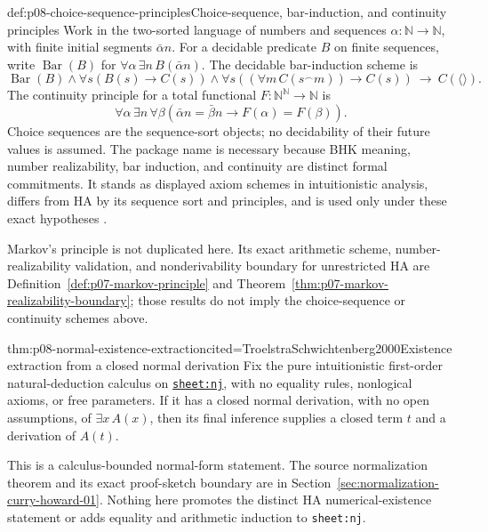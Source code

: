 \begin{hbdefinition}{def:p08-choice-sequence-principles}{Choice-sequence, bar-induction, and continuity principles}
Work in the two-sorted language of numbers and sequences
\(\alpha:\mathbb N\to\mathbb N\), with finite initial segments
\(\bar\alpha n\). For a decidable predicate \(B\) on finite sequences, write
\(\operatorname{Bar}(B)\) for
\(\forall\alpha\,\exists n\,B(\bar\alpha n)\). The decidable bar-induction
scheme is
\[
 \operatorname{Bar}(B)\land
 \forall s(B(s)\to C(s))\land
 \forall s((\forall m\,C(s^\frown m))\to C(s))
 \ \to\ C(\langle\rangle).
\]
The continuity principle for a total functional
\(F:\mathbb N^{\mathbb N}\to\mathbb N\) is
\[
 \forall\alpha\,\exists n\,\forall\beta
 (\bar\alpha n=\bar\beta n\to F(\alpha)=F(\beta)).
\]
Choice sequences are the sequence-sort objects; no decidability of their
future values is assumed. The package name is necessary because BHK meaning,
number realizability, bar induction, and continuity are distinct formal
commitments. It stands as displayed axiom schemes in intuitionistic analysis,
differs from HA by its sequence sort and principles, and is used only under
these exact hypotheses \cite{TroelstraVanDalen1988}.
\end{hbdefinition}

Markov's principle is not duplicated here. Its exact arithmetic scheme,
number-realizability validation, and nonderivability boundary for unrestricted
HA are Definition~\ref{def:p07-markov-principle} and
Theorem~\ref{thm:p07-markov-realizability-boundary}; those results do not imply
the choice-sequence or continuity schemes above.

\begin{hbtheorem}{thm:p08-normal-existence-extraction}{cited=TroelstraSchwichtenberg2000}{Existence extraction from a closed normal derivation}
Fix the pure intuitionistic first-order natural-deduction calculus on
\hyperref[sheet:nj]{\texttt{sheet:nj}}, with no equality rules, nonlogical
axioms, or free parameters.  If it has a closed normal derivation, with no open
assumptions, of \(\exists x\,A(x)\), then its final inference supplies a closed
term \(t\) and a derivation of \(A(t)\).
\end{hbtheorem}

This is a calculus-bounded normal-form statement.  The source normalization
theorem and its exact proof-sketch boundary are in
Section~\ref{sec:normalization-curry-howard-01}.  Nothing here
promotes the distinct HA numerical-existence statement or adds equality and
arithmetic induction to \texttt{sheet:nj}.

